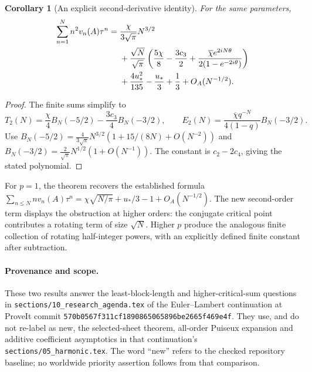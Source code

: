 \documentclass[11pt,a4paper]{article}
\numberwithin{equation}{section}
\newtheorem{corollary}[theorem]{Corollary}
\theoremstyle{definition}
\theoremstyle{remark}
\newcommand{\shuffle}{\mathbin{\amalg}}
\begin{document}
\begin{corollary}[An explicit second-derivative identity]
\label{newdiag:cor:p2}
For the same parameters,
\begin{align}
 \sum_{n=1}^N n^2v_n(A)\tau^n
 ={}&\frac{\chi}{3\sqrt\pi}N^{3/2}\notag\\
 &+\frac{\sqrt N}{\sqrt\pi}
   \left(\frac{5\chi}{8}-\frac{3c_3}{2}
       +\frac{\overline\chi e^{2iN\theta}}
                    {2(1-e^{-2i\theta})}\right)\notag\\
 &+\frac{4u_*^2}{135}-\frac{u_*}{3}+\frac13
       +O_A(N^{-1/2}).\label{newdiag:eq:p2}
\end{align}
\end{corollary}

\begin{proof}
The finite sums simplify to
\[
 T_2(N)=\frac\chi4 B_N(-5/2)-\frac{3c_3}4B_N(-3/2),
 \qquad
 E_2(N)=\frac{\overline\chi q^{-N}}{4(1-q)}B_N(-3/2).
\]
Use
$B_N(-5/2)=\frac4{3\sqrt\pi}N^{3/2}
 (1+15/(8N)+O(N^{-2}))$ and
$B_N(-3/2)=\frac2{\sqrt\pi}N^{1/2}(1+O(N^{-1}))$.
The constant is $c_2-2c_4$, giving the stated polynomial.
\end{proof}

For $p=1$, the theorem recovers the established formula
$\sum_{n\leq N}nv_n(A)\tau^n
=\chi\sqrt{N/\pi}+u_*/3-1+O_A(N^{-1/2})$.
The new second-order term displays the obstruction at higher orders:
the conjugate critical point contributes a rotating term of size
$\sqrt N$.  Higher $p$ produce the analogous finite collection of
rotating half-integer powers, with an explicitly defined finite
constant after subtraction.

\paragraph{Provenance and scope.}
These two results answer the least-block-length and higher-critical-sum
questions in
\texttt{sections/10\_research\_agenda.tex} of the Euler--Lambert continuation \cite{RepoLerch}
at ProveIt commit
\texttt{570b0567f311cf1890865065896be2665f469e4f}.
They use, and do not re-label as new, the selected-sheet theorem,
all-order Puiseux expansion and additive coefficient asymptotics in
that continuation's \texttt{sections/05\_harmonic.tex}.
The word ``new'' refers to the checked repository baseline;
no worldwide priority assertion follows from that comparison.



\providecommand{\shuffle}{\mathbin{\sqcup\!\sqcup}}
\end{document}
